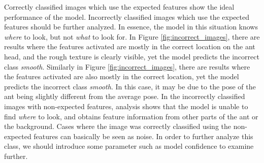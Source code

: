 \documentclass{aci}
\numberwithin{equation}{section}
\begin{document}
Correctly classified images which use the expected features show the ideal
performance of the model. Incorrectly classified images which use the expected
features should be further analyzed. In essence, the model in this situation
knows \textit{where} to look, but not \textit{what} to look for. In Figure
\ref{fig:incorrect_images}, there are results where the features activated are
mostly in the correct location on the ant head, and the rough texture is clearly
visible, yet the model predicts the incorrect class \textit{smooth}. Similarly
in Figure \ref{fig:incorrect_images}, there are results where the features
activated are also mostly in the correct location, yet the model predicts the
incorrect class \textit{smooth}. In this case, it may be due to the pose of the
ant being slightly different from the average pose. In the incorrectly
classified images with non-expected features, analysis shows that the model is
unable to find \textit{where} to look, and obtains feature information from
other parts of the ant or the background. Cases where the image was correctly
classified using the non-expected features can basically be seen as noise. In
order to further analyze this class, we should introduce some parameter such as
model confidence to examine further.
\end{document}
